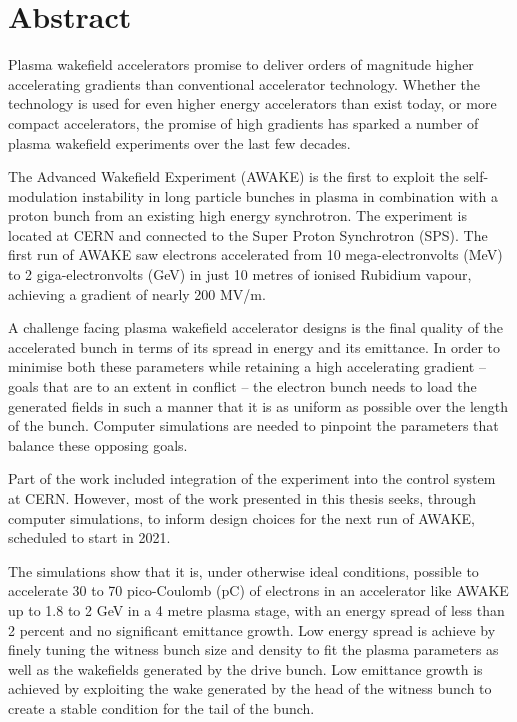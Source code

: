 \chapter*{Abstract}
\label{Abstract}

Plasma wakefield accelerators promise to deliver orders of magnitude higher accelerating gradients than conventional accelerator technology.
Whether the technology is used for even higher energy accelerators than exist today, or more compact accelerators, the promise of high gradients has sparked a number of plasma wakefield experiments over the last few decades.

The Advanced Wakefield Experiment (AWAKE) is the first to exploit the self-modulation instability in long particle bunches in plasma in combination with a proton bunch from an existing high energy synchrotron.
The experiment is located at CERN and connected to the Super Proton Synchrotron (SPS).
The first run of AWAKE saw electrons accelerated from 10 mega-electronvolts (MeV) to 2 giga-electronvolts (GeV) in just 10 metres of ionised Rubidium vapour, achieving a gradient of nearly 200 MV/m.

A challenge facing plasma wakefield accelerator designs is the final quality of the accelerated bunch in terms of its spread in energy and its emittance.
In order to minimise both these parameters while retaining a high accelerating gradient -- goals that are to an extent in conflict -- the electron bunch needs to load the generated fields in such a manner that it is as uniform as possible over the length of the bunch.
Computer simulations are needed to pinpoint the parameters that balance these opposing goals.

Part of the work included integration of the experiment into the control system at CERN.
However, most of the work presented in this thesis seeks, through computer simulations, to inform design choices for the next run of AWAKE, scheduled to start in 2021. 

The simulations show that it is, under otherwise ideal conditions, possible to accelerate 30 to 70 pico-Coulomb (pC) of electrons in an accelerator like AWAKE up to 1.8 to 2 GeV in a 4 metre plasma stage, with an energy spread of less than 2 percent and no significant emittance growth.
Low energy spread is achieve by finely tuning the witness bunch size and density to fit the plasma parameters as well as the wakefields generated by the drive bunch.
Low emittance growth is achieved by exploiting the wake generated by the head of the witness bunch to create a stable condition for the tail of the bunch.
